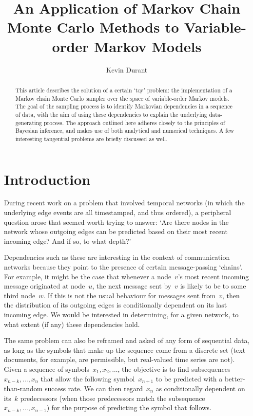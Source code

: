\documentclass[11pt,a4paper]{article}
\title{An Application of Markov Chain Monte Carlo Methods to Variable-order
  Markov Models}
\author{Kevin Durant}
\date{}
\begin{document}
\maketitle

\begin{abstract}
This article describes the solution of a certain `toy' problem: the
implementation of a Markov chain Monte Carlo sampler over the space of
variable-order Markov models. The goal of the sampling process is to identify
Markovian dependencies in a sequence of data, with the aim of using these
dependencies to explain the underlying data-generating process. The approach
outlined here adheres closely to the principles of Bayesian inference, and makes
use of both analytical and numerical techniques. A few interesting tangential
problems are briefly discussed as well.
\end{abstract}

\section{Introduction} %

During recent work on a problem that involved temporal networks (in which the
underlying edge events are all timestamped, and thus ordered), a peripheral
question arose that seemed worth trying to answer: `Are there nodes in
the network whose outgoing edges can be predicted based on their most recent
incoming edge? And if so, to what depth?'

Dependencies such as these are interesting in the context of communication
networks because they point to the presence of certain message-passing `chains'.
For example, it might be the case that whenever a node~\(v\)'s most recent
incoming message originated at node~\(u\), the next message sent by~\(v\) is
likely to be to some third node~\(w\). If this is not the usual behaviour for
messages sent from~\(v\), then the distribution of its outgoing edges is
conditionally dependent on its last incoming edge. We would be interested in
determining, for a given network, to what extent (if any) these dependencies
hold.

The same problem can also be reframed and asked of any form of sequential data,
as long as the symbols that make up the sequence come from a discrete set (text
documents, for example, are permissible, but real-valued time series are not).
Given a sequence of symbols~\(x_1, x_2, \dots\), the objective is to find
subsequences~\(x_{n-k}, \dots, x_n\) that allow the following symbol~\(x_{n+1}\)
to be predicted with a better-than-random success rate. We can then
regard~\(x_n\) as conditionally dependent on its~\(k\) predecessors (when those
predecessors match the subsequence~\(x_{n-k}, \dots, x_{n-1}\)) for the purpose
of predicting the symbol that follows.
\end{document}
